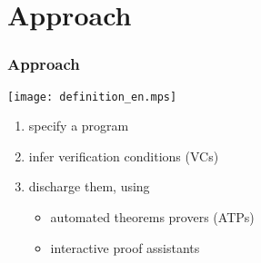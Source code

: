 \documentclass[xcolor=dvipsnames]{beamer}
\begin{document}
\section*{Approach}
\begin{frame}
\frametitle{Approach}
\texttt{[image: definition\_en.mps]}
\bigskip 
  \begin{enumerate}
  \item {\red specify} a program  
	\item {\red infer} verification conditions (VCs) 
  \item {\red discharge} them, using 
    \begin{itemize}
    \item {\red automated} theorems provers (ATPs)
    \item interactive {\red proof assistants}
    \end{itemize}
  \end{enumerate}
\end{frame}
\end{document}
